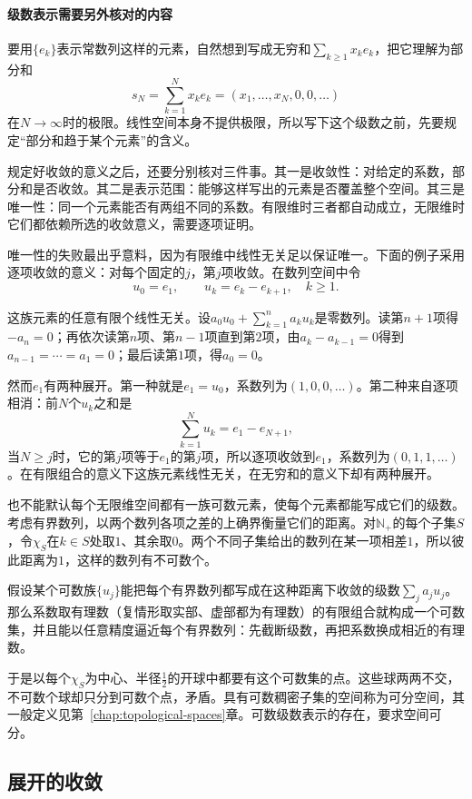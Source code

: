 \paragraph{级数表示需要另外核对的内容}
要用$\{e_k\}$表示常数列这样的元素，自然想到写成无穷和$\sum_{k\geq1}x_ke_k$，把它理解为部分和
\[
 s_N=\sum_{k=1}^Nx_ke_k=(x_1,\ldots,x_N,0,0,\ldots)
\]
在$N\to\infty$时的极限。线性空间本身不提供极限，所以写下这个级数之前，先要规定“部分和趋于某个元素”的含义。

规定好收敛的意义之后，还要分别核对三件事。其一是收敛性：对给定的系数，部分和是否收敛。其二是表示范围：能够这样写出的元素是否覆盖整个空间。其三是唯一性：同一个元素能否有两组不同的系数。有限维时三者都自动成立，无限维时它们都依赖所选的收敛意义，需要逐项证明。

唯一性的失败最出乎意料，因为有限维中线性无关足以保证唯一。下面的例子采用逐项收敛的意义：对每个固定的$j$，第$j$项收敛。在数列空间中令
\[
 u_0=e_1,\qquad u_k=e_k-e_{k+1},\quad k\geq1.
\]

这族元素的任意有限个线性无关。设$a_0u_0+\sum_{k=1}^na_ku_k$是零数列。读第$n+1$项得$-a_n=0$；再依次读第$n$项、第$n-1$项直到第$2$项，由$a_k-a_{k-1}=0$得到$a_{n-1}=\cdots=a_1=0$；最后读第$1$项，得$a_0=0$。

然而$e_1$有两种展开。第一种就是$e_1=u_0$，系数列为$(1,0,0,\ldots)$。第二种来自逐项相消：前$N$个$u_k$之和是
\[
 \sum_{k=1}^Nu_k=e_1-e_{N+1},
\]
当$N\geq j$时，它的第$j$项等于$e_1$的第$j$项，所以逐项收敛到$e_1$，系数列为$(0,1,1,\ldots)$。在有限组合的意义下这族元素线性无关，在无穷和的意义下却有两种展开。

也不能默认每个无限维空间都有一族可数元素，使每个元素都能写成它们的级数。考虑有界数列，以两个数列各项之差的上确界衡量它们的距离。对$\mathbb N_+$的每个子集$S$，令$\chi_S$在$k\in S$处取$1$、其余取$0$。两个不同子集给出的数列在某一项相差$1$，所以彼此距离为$1$，这样的数列有不可数个。

假设某个可数族$\{u_j\}$能把每个有界数列都写成在这种距离下收敛的级数$\sum_ja_ju_j$。那么系数取有理数（复情形取实部、虚部都为有理数）的有限组合就构成一个可数集，并且能以任意精度逼近每个有界数列：先截断级数，再把系数换成相近的有理数。

于是以每个$\chi_S$为中心、半径$\tfrac12$的开球中都要有这个可数集的点。这些球两两不交，不可数个球却只分到可数个点，矛盾。具有可数稠密子集的空间称为可分空间，其一般定义见第~\ref{chap:topological-spaces}章。可数级数表示的存在，要求空间可分。

\subsection{展开的收敛}
\label{sec:fvec-expansion-convergence}

